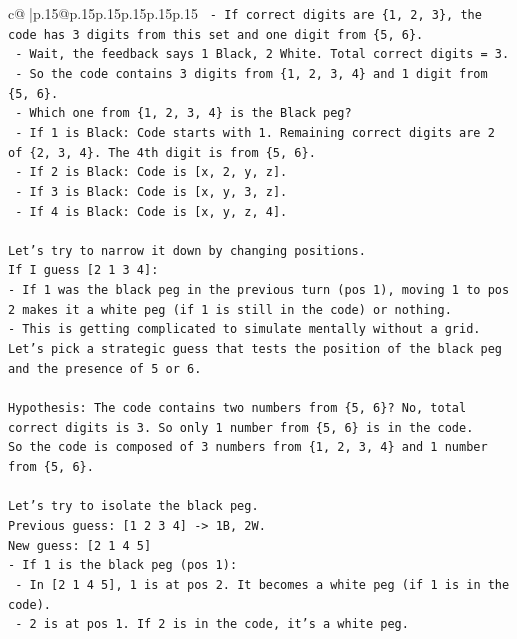 \documentclass{article}
\begin{document}
{\begin{supertabular}{c@{$\;$}|p{.15\linewidth}@{}p{.15\linewidth}p{.15\linewidth}p{.15\linewidth}p{.15\linewidth}p{.15\linewidth}}
{{{\texttt{   {-} If correct digits are \{1, 2, 3\}, the code has 3 digits from this set and one digit from \{5, 6\}.} \\
\texttt{   {-} Wait, the feedback says 1 Black, 2 White. Total correct digits = 3.} \\
\texttt{   {-} So the code contains 3 digits from \{1, 2, 3, 4\} and 1 digit from \{5, 6\}.} \\
\texttt{   {-} Which one from \{1, 2, 3, 4\} is the Black peg?} \\
\texttt{     {-} If 1 is Black: Code starts with 1. Remaining correct digits are 2 of \{2, 3, 4\}. The 4th digit is from \{5, 6\}.} \\
\texttt{     {-} If 2 is Black: Code is {[}x, 2, y, z{]}.} \\
\texttt{     {-} If 3 is Black: Code is {[}x, y, 3, z{]}.} \\
\texttt{     {-} If 4 is Black: Code is {[}x, y, z, 4{]}.} \\
\\ 
\texttt{Let's try to narrow it down by changing positions.} \\
\texttt{If I guess {[}2 1 3 4{]}:} \\
\texttt{{-} If 1 was the black peg in the previous turn (pos 1), moving 1 to pos 2 makes it a white peg (if 1 is still in the code) or nothing.} \\
\texttt{{-} This is getting complicated to simulate mentally without a grid. Let's pick a strategic guess that tests the position of the black peg and the presence of 5 or 6.} \\
\\ 
\texttt{Hypothesis: The code contains two numbers from \{5, 6\}? No, total correct digits is 3. So only 1 number from \{5, 6\} is in the code.} \\
\texttt{So the code is composed of 3 numbers from \{1, 2, 3, 4\} and 1 number from \{5, 6\}.} \\
\\ 
\texttt{Let's try to isolate the black peg.} \\
\texttt{Previous guess: {[}1 2 3 4{]} {-}> 1B, 2W.} \\
\texttt{New guess: {[}2 1 4 5{]}} \\
\texttt{{-} If 1 is the black peg (pos 1):} \\
\texttt{  {-} In {[}2 1 4 5{]}, 1 is at pos 2. It becomes a white peg (if 1 is in the code).} \\
\texttt{  {-} 2 is at pos 1. If 2 is in the code, it's a white peg.} \\
}}}
\end{supertabular}}
\end{document}
